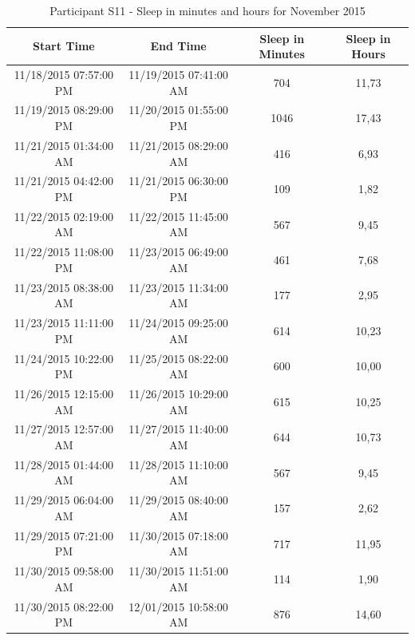 \documentclass[12pt]{article} %
\begin{document}
\begin{table}[H]
\center
\begin{footnotesize}
	\begin{tabular}{| c | c | c | c |}
	\hline
	\textbf{Start Time} & \textbf{End Time} & \textbf{Sleep in Minutes} & \textbf{Sleep in Hours} \\
	\hline
11/18/2015 07:57:00 PM & 11/19/2015 07:41:00 AM & 704	& 11,73 \\
\hline
11/19/2015 08:29:00 PM & 11/20/2015 01:55:00 PM & 1046 & 17,43\\
\hline
\colorbox{blue!20}{11/21/2015 01:34:00 AM} & \colorbox{blue!20}{11/21/2015 08:29:00 AM} & \colorbox{blue!20}{416} & \colorbox{blue!20}{6,93}\\
\hline
\colorbox{blue!20}{11/21/2015 04:42:00 PM} & \colorbox{blue!20}{11/21/2015 06:30:00 PM } & \colorbox{blue!20}{109} & \colorbox{blue!20}{1,82}\\
\hline
\colorbox{blue!30}{11/22/2015 02:19:00 AM} & \colorbox{blue!30}{11/22/2015 11:45:00 AM} & \colorbox{blue!30}{567} & \colorbox{blue!30}{9,45}\\
\hline
\colorbox{blue!30}{11/22/2015 11:08:00 PM} & \colorbox{blue!30}{11/23/2015 06:49:00 AM} & \colorbox{blue!30}{461} & \colorbox{blue!30}{7,68}\\
\hline
11/23/2015 08:38:00 AM & 11/23/2015 11:34:00 AM & 177 & 2,95\\
\hline
11/23/2015 11:11:00 PM & 11/24/2015 09:25:00 AM & 614 & 10,23\\
\hline
11/24/2015 10:22:00 PM & 11/25/2015 08:22:00 AM & 600 & 10,00\\
\hline
11/26/2015 12:15:00 AM & 11/26/2015 10:29:00 AM	& 615 & 10,25\\
\hline
11/27/2015 12:57:00 AM & 11/27/2015 11:40:00 AM	& 644 & 10,73\\
\hline
\colorbox{blue!20}{11/28/2015 01:44:00 AM} & \colorbox{blue!20}{11/28/2015 11:10:00 AM} & \colorbox{blue!20}{567} & \colorbox{blue!20}{9,45}\\
\hline
\colorbox{blue!30}{11/29/2015 06:04:00 AM} & \colorbox{blue!30}{11/29/2015 08:40:00 AM} & \colorbox{blue!30}{157} & \colorbox{blue!30}{2,62}\\
\hline
\colorbox{blue!30}{11/29/2015 07:21:00 PM} & \colorbox{blue!30}{11/30/2015 07:18:00 AM} & \colorbox{blue!30}{717} & \colorbox{blue!30}{11,95}\\
\hline
11/30/2015 09:58:00 AM & 11/30/2015 11:51:00 AM & 114 & 1,90\\
\hline
11/30/2015 08:22:00 PM & 12/01/2015 10:58:00 AM & 876 & 14,60\\
	\hline
	\end{tabular}
	\caption{Participant S11 - Sleep in minutes and hours for November 2015}
	\label{tab:S11NovPhone}
\end{footnotesize}
\end{table}
\end{document}
